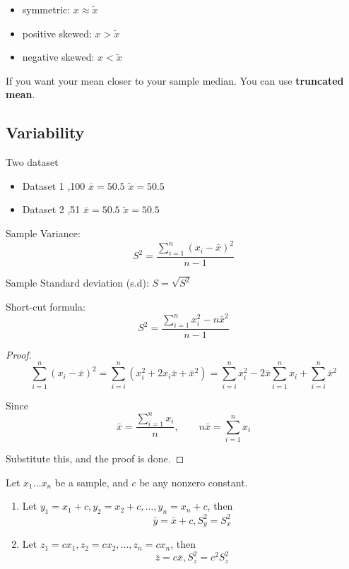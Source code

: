 \begin{itemize}
  \item symmetric: $x\approx \tilde{x}$
  \item positive skewed: $x>\tilde{x}$
  \item negative skewed: $x<\tilde{x}$
\end{itemize}

If you want your mean closer to your sample median. You can use \textbf{truncated mean}.

\subsection{Variability}
\begin{exmp}
Two dataset
  \begin{itemize}
    \item Dataset 1 ,100 \qquad  $\bar{x}=50.5$ \qquad $\tilde{x}=50.5$
    \item Dataset 2 ,51 \qquad  $\bar{x}=50.5$ \qquad $\tilde{x}=50.5$
  \end{itemize}
\end{exmp}

Sample Variance: \[S^2=\frac{\sum_{i=1}^{n} (x_i-\bar{x})^2}{n-1}\]

Sample Standard deviation (s.d): $S=\sqrt{S^2}$

Short-cut formula:
\[S^2=\frac{{\sum_{i=1}^{n} x_i^2} - n{\bar{x}}^2}{n-1}
\]
\begin{proof}
\[\sum_{i=1}^{n}(x_i-\bar{x})^2=
\sum_{i=i}^{n}(x_i^2+2x_i\bar{x}+{\bar{x}}^2)=
\sum_{i=i}^{n}x_i^2-2\bar{x}\sum_{i=1}^{n}x_i+
\sum_{i=i}^{n}\bar{x}^2 \]

Since 
\[\bar{x}=\frac{\sum_{i=1}^{n} x_i}{n}, \qquad n\bar{x}=\sum_{i=1}^{n} x_i \]

Substitute this, and the proof is done. 
\end{proof}

\begin{prop}
Let $x_1 \dots x_n$ be a sample, and $c$ be any nonzero constant.

\begin{enumerate}
\item Let $y_1=x_1+c,y_2=x_2+c,\dots,y_n=x_n+c$, then
\[\bar{y}=\bar{x}+c, S_y^2=S_x^2\]
\item Let $z_1=cx_1,z_2=cx_2,\dots,z_n=cx_n$, then
\[\bar{z}=c \bar{x}, S_z^2=c^2S_z^2\]
\end{enumerate}
\end{prop}

